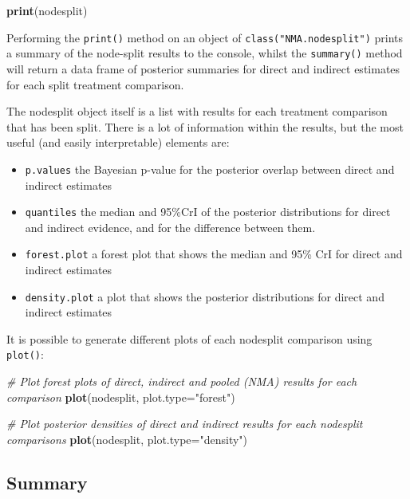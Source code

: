 \documentclass[]{article}
\newenvironment{Shaded}{\begin{snugshade}}{\end{snugshade}}
\newcommand{\CommentTok}[1]{\textcolor[rgb]{0.56,0.35,0.01}{\textit{#1}}}
\newcommand{\DataTypeTok}[1]{\textcolor[rgb]{0.13,0.29,0.53}{#1}}
\newcommand{\KeywordTok}[1]{\textcolor[rgb]{0.13,0.29,0.53}{\textbf{#1}}}
\newcommand{\NormalTok}[1]{#1}
\newcommand{\StringTok}[1]{\textcolor[rgb]{0.31,0.60,0.02}{#1}}
\providecommand{\tightlist}{%
  \setlength{\itemsep}{0pt}\setlength{\parskip}{0pt}}
\begin{document}
\begin{Shaded}
\begin{Highlighting}[]
\KeywordTok{print}\NormalTok{(nodesplit)}
\end{Highlighting}
\end{Shaded}

Performing the \texttt{print()} method on an object of
\texttt{class("NMA.nodesplit")} prints a summary of the node-split
results to the console, whilst the \texttt{summary()} method will return
a data frame of posterior summaries for direct and indirect estimates
for each split treatment comparison.

The nodesplit object itself is a list with results for each treatment
comparison that has been split. There is a lot of information within the
results, but the most useful (and easily interpretable) elements are:

\begin{itemize}
\tightlist
\item
  \texttt{p.values} the Bayesian p-value for the posterior overlap
  between direct and indirect estimates
\item
  \texttt{quantiles} the median and 95\%CrI of the posterior
  distributions for direct and indirect evidence, and for the difference
  between them.
\item
  \texttt{forest.plot} a forest plot that shows the median and 95\% CrI
  for direct and indirect estimates
\item
  \texttt{density.plot} a plot that shows the posterior distributions
  for direct and indirect estimates
\end{itemize}

It is possible to generate different plots of each nodesplit comparison
using \texttt{plot()}:

\begin{Shaded}
\begin{Highlighting}[]
\CommentTok{# Plot forest plots of direct, indirect and pooled (NMA) results for each comparison}
\KeywordTok{plot}\NormalTok{(nodesplit, }\DataTypeTok{plot.type=}\StringTok{"forest"}\NormalTok{)}

\CommentTok{# Plot posterior densities of direct and indirect results for each nodesplit comparisons}
\KeywordTok{plot}\NormalTok{(nodesplit, }\DataTypeTok{plot.type=}\StringTok{"density"}\NormalTok{)}
\end{Highlighting}
\end{Shaded}

\hypertarget{summary}{%
\subsection{Summary}\label{summary}}
\end{document}
